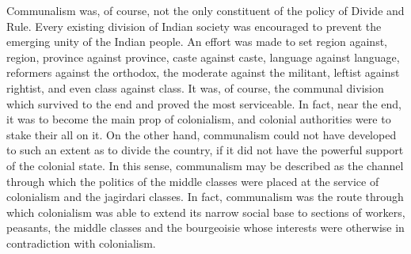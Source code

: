 Communalism was, of course, not the only constituent of the policy of Divide and Rule. Every existing division of Indian society was encouraged to prevent the emerging unity of the Indian people. An effort was made to set region against, region, province against province, caste against caste, language against language, reformers against the orthodox, the moderate against the militant, leftist against rightist, and even class against class. It was, of course, the communal division which survived to the end and proved the most serviceable. In fact, near the end, it was to become the main prop of colonialism, and colonial authorities were to stake their all on it. On the other hand, communalism could not have developed to such an extent as to divide the country, if it did not have the powerful support of the colonial state. In this sense, communalism may be described as the channel through which the politics of the middle classes were placed at the service of colonialism and the jagirdari classes. In fact, communalism was the route through which colonialism was able to extend its narrow social base to sections of workers, peasants, the middle classes and the bourgeoisie whose interests were otherwise in contradiction with colonialism. 

